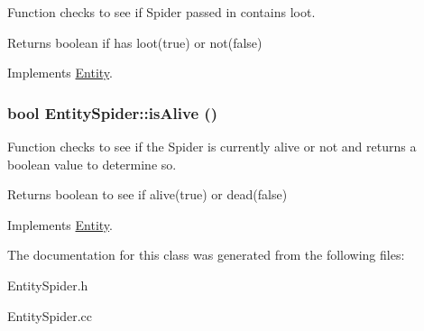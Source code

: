 Function checks to see if Spider passed in contains loot. \begin{DoxyReturn}{Returns}
boolean if has loot(true) or not(false) 
\end{DoxyReturn}


Implements \hyperlink{classEntity_aaac21381e4a788de507e706ce8d188c1}{Entity}.\hypertarget{classEntitySpider_afcdcadef8e129a3ef4c4bf883c237065}{
\subsubsection[{isAlive}]{\setlength{\rightskip}{0pt plus 5cm}bool EntitySpider::isAlive ()}}
\label{classEntitySpider_afcdcadef8e129a3ef4c4bf883c237065}


Function checks to see if the Spider is currently alive or not and returns a boolean value to determine so. \begin{DoxyReturn}{Returns}
boolean to see if alive(true) or dead(false) 
\end{DoxyReturn}


Implements \hyperlink{classEntity_a0c67d5136d2c945e0911bd547d766586}{Entity}.

The documentation for this class was generated from the following files:\begin{DoxyCompactItemize}
\item 
EntitySpider.h\item 
EntitySpider.cc\end{DoxyCompactItemize}
